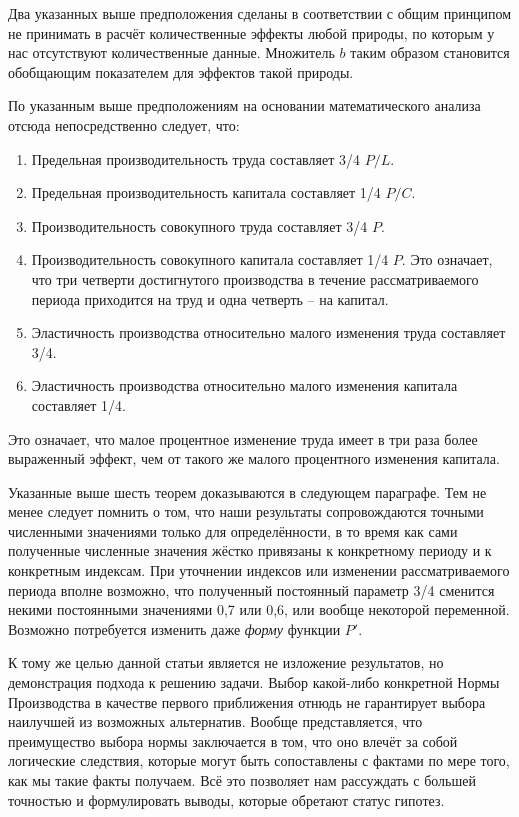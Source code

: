 \documentclass[leqno]{article}  %
\begin{document}
Два указанных выше предположения сделаны в соответствии с общим принципом не принимать в расчёт количественные эффекты любой природы, по которым у нас отсутствуют количественные данные. Множитель \(b\) таким образом становится обобщающим показателем для эффектов такой природы.
\par
По указанным выше предположениям на основании математического анализа отсюда непосредственно следует, что:
\par
\begin{enumerate}[{I.}]
\item Предельная производительность труда составляет 3/4 \(P/L\).
\item Предельная производительность капитала составляет 1/4 \(P/C\).
\item Производительность совокупного труда составляет 3/4 \(P\).
\item Производительность совокупного капитала составляет 1/4 \(P\).
Это означает, что три четверти достигнутого производства в течение рассматриваемого периода приходится на труд и одна четверть -- на капитал.
\item Эластичность производства относительно малого изменения труда составляет 3/4.
\item Эластичность производства относительно малого изменения капитала составляет 1/4.
\end{enumerate}
Это означает, что малое процентное изменение труда имеет в три раза более выраженный эффект, чем от такого же малого процентного изменения капитала.
\par
Указанные выше шесть теорем доказываются в следующем параграфе. Тем не менее следует помнить о том, что наши результаты сопровождаются точными численными значениями только для определённости, в то время как сами полученные численные значения жёстко привязаны к конкретному периоду и к конкретным индексам. При уточнении индексов или изменении рассматриваемого периода вполне возможно, что полученный постоянный параметр 3/4 сменится некими постоянными значениями 0,7 или 0,6, или вообще некоторой переменной. Возможно потребуется изменить даже \emph{форму} функции \(P'\).
\par
К тому же целью данной статьи является не изложение результатов, но демонстрация подхода к решению задачи. Выбор какой-либо конкретной Нормы Производства в качестве первого приближения отнюдь не гарантирует выбора наилучшей из возможных альтернатив. Вообще представляется, что преимущество выбора нормы заключается в том, что оно влечёт за собой логические следствия, которые могут быть сопоставлены с фактами по мере того, как мы такие факты получаем. Всё это позволяет нам рассуждать с большей точностью и формулировать выводы, которые обретают статус гипотез.
\end{document}
